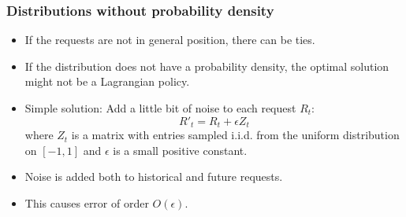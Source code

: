 \documentclass[usenames,dvipsnames]{beamer}
\begin{document}
\begin{frame}
\frametitle{Distributions without probability density}

\begin{itemize}
\item If the requests are not in general position, there can be ties.

\item If the distribution does not have a probability density, the optimal
solution might not be a Lagrangian policy.

\item Simple solution: Add a little bit of noise to each request $R_t$:
$$
R'_t = R_t + \epsilon Z_t
$$
where $Z_t$ is a matrix with entries sampled i.i.d. from the uniform distribution on $[-1,1]$
and $\epsilon$ is a small positive constant.

\item Noise is added both to historical and future requests.

\item This causes error of order $O(\epsilon)$.
\end{itemize}
\end{frame}
\end{document}
